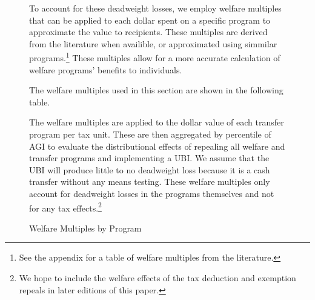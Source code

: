\documentclass{article}
\begin{document}
\begin{figure}[H]
To account for these deadweight losses, we employ welfare multiples that can be applied to each dollar spent on a specific program to approximate the value to recipients. These multiples are derived from the literature when availible, or approximated using simmilar programs.\footnote{See the appendix for a table of welfare multiples from the literature.} These multiples allow for a more accurate calculation of welfare programs' benefits to individuals.

The welfare multiples used in this section are shown in the following table.


\begin{table}[H]
\caption{Welfare Multiples by Program}
\begin{center}
\begin{adjustbox}{max width=\textwidth}

\end{adjustbox}
\end{center}
\end{table}

The welfare multiples are applied to the dollar value of each transfer program per tax unit. These are then aggregated by percentile of AGI to evaluate the distributional effects of repealing all welfare and transfer programs and implementing a UBI. We assume that the UBI will produce little to no deadweight loss because it is a cash transfer without any means testing. These welfare multiples only account for deadweight losses in the programs themselves and not for any tax effects.\footnote{We hope to include the welfare effects of the tax deduction and exemption repeals in later editions of this paper.}


\end{figure}
\end{document}
